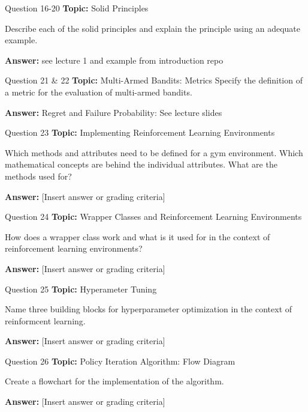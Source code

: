 \begin{frame}{Question 16-20}
    \textbf{Topic:} Solid Principles

    Describe each of the solid principles and explain the principle using an adequate example. 
    \vspace{20pt}

    \textbf{Answer:} see lecture 1 and example from introduction repo
\end{frame}

\begin{frame}{Question 21 \& 22}
    \textbf{Topic:} Multi-Armed Bandits: Metrics
    \vspace{10pt}
    Specify the definition of a metric for the evaluation of multi-armed bandits.
    \vspace{20pt}

    \textbf{Answer:} Regret and Failure Probability: See lecture slides
\end{frame}

\begin{frame}{Question 23}
    \textbf{Topic:} Implementing Reinforcement Learning Environments
    
    \vspace{10pt}
    Which methods and attributes need to be defined for a gym environment. Which mathematical concepts are behind the individual attributes. What are the methods used for? 
    \vspace{20pt}

    \textbf{Answer:} [Insert answer or grading criteria]
\end{frame}

\begin{frame}{Question 24}
    \textbf{Topic:} Wrapper Classes and Reinforcement Learning Environments

    \vspace{10pt}
    How does a wrapper class work and what is it used for in the context of reinforcement learning environments?   
    \vspace{20pt}

    \textbf{Answer:} [Insert answer or grading criteria]
\end{frame}

\begin{frame}{Question 25}
    \textbf{Topic:} Hyperameter Tuning

    \vspace{10pt}
    Name three building blocks for hyperparameter optimization in the context of reinformcent learning.  
    \vspace{20pt}

    \textbf{Answer:} [Insert answer or grading criteria]
\end{frame}
\begin{frame}{Question 26}
    \textbf{Topic:} Policy Iteration Algorithm: Flow Diagram

    \vspace{10pt}
    Create a flowchart for the implementation of the algorithm. 
    \vspace{20pt}

    \textbf{Answer:} [Insert answer or grading criteria]
\end{frame}

